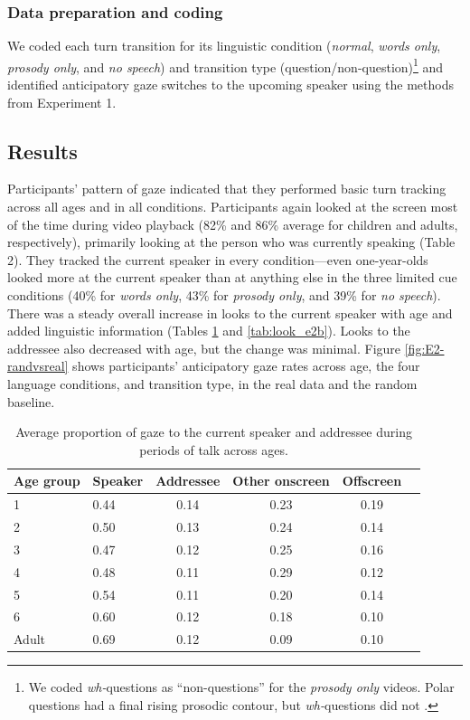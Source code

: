 \documentclass[authoryear, 12pt]{elsarticle}
\begin{document}
\subsubsection{Data preparation and coding}
We coded each turn transition for its linguistic condition (\textit{normal}, \textit{words only}, \textit{prosody only}, and \textit{no speech}) and transition type (question/non-question)\footnote{We coded \textit{wh-}questions as ``non-questions'' for the \textit{prosody only} videos. Polar questions had a final rising prosodic contour, but \textit{wh-}questions did not  \citep{hedberg2010}.} and identified anticipatory gaze switches to the upcoming speaker using the methods from Experiment 1.

\subsection{Results}
\label{sec:results2}

Participants' pattern of gaze indicated that they performed basic turn tracking across all ages and in all conditions. Participants again looked at the screen most of the time during video playback (82\% and 86\% average for children and adults, respectively), primarily looking at the person who was currently speaking (Table 2). They tracked the current speaker in every condition---even one-year-olds looked more at the current speaker than at anything else in the three limited cue conditions (40\% for \textit{words only}, 43\% for \textit{prosody only}, and 39\% for \textit{no speech}). There was a steady overall increase in looks to the current speaker with age and added linguistic information (Tables \ref{tab:look_e2} and \ref{tab:look_e2b}). Looks to the addressee also decreased with age, but the change was minimal. Figure \ref{fig:E2-randvsreal} shows participants' anticipatory gaze rates across age, the four language conditions, and transition type, in the real data and the random baseline.

\begin{table}[h]
\begin{center}
  \begin{tabular}{llcccc}
    \hline
    Age group & Speaker & Addressee & Other onscreen & Offscreen\\ 
    \hline
    1 & 0.44 & 0.14 & 0.23 & 0.19 \\ 
    2 & 0.50 & 0.13 & 0.24 & 0.14 \\ 
    3 & 0.47 & 0.12 & 0.25 & 0.16 \\ 
    4 & 0.48 & 0.11 & 0.29 & 0.12 \\ 
    5 & 0.54 & 0.11 & 0.20 & 0.14 \\ 
    6 & 0.60 & 0.12 & 0.18 & 0.10 \\
    Adult & 0.69 & 0.12 & 0.09 & 0.10 \\
    \hline
  \end{tabular}
\end{center}
  \caption{Average proportion of gaze to the current speaker and addressee during periods of talk across ages.}
\label{tab:look_e2}
\end{table}
\end{document}
